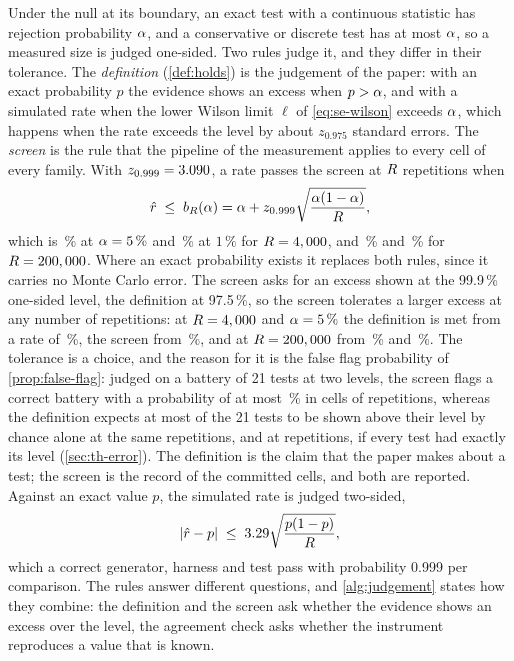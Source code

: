 Under the null at its boundary, an exact test with a continuous statistic has rejection probability $\alpha$, and a conservative or discrete test has at most $\alpha$, so a measured size is judged one-sided.
Two rules judge it, and they differ in their tolerance.
The \emph{definition} (\cref{def:holds}) is the judgement of the paper: with an exact probability $p$ the evidence shows an excess when $p>\alpha$, and with a simulated rate when the lower Wilson limit $\ell$ of \eqref{eq:se-wilson} exceeds $\alpha$, which happens when the rate exceeds the level by about $z_{0.975}$ standard errors.
The \emph{screen} is the rule that the pipeline of the measurement applies to every cell of every family.
With $z_{0.999}=3.090$, a rate passes the screen at $R$ repetitions when
\begin{equation}
\hat{r}\;\le\; b_R(\alpha)=\alpha+z_{0.999}\sqrt{\frac{\alpha(1-\alpha)}{R}},
\label{eq:bound}
\end{equation}
which is \boundFive\,\% at $\alpha=5\,\%$ and \boundOne\,\% at $1\,\%$ for $R=4,000{}$, and \boundFivePool\,\% and \boundOnePool\,\% for $R=200,000{}$.
Where an exact probability exists it replaces both rules, since it carries no Monte Carlo error.
The screen asks for an excess shown at the 99.9\,\% one-sided level, the definition at 97.5\,\%, so the screen tolerates a larger excess at any number of repetitions: at $R=4,000{}$ and $\alpha=5\,\%$ the definition is met from a rate of \intRateFiveFour\,\%, the screen from \boundFive\,\%, and at $R=200,000{}$ from \intRateFiveTwoHundredK\,\% and \boundFivePool\,\%.
The tolerance is a choice, and the reason for it is the false flag probability of \cref{prop:false-flag}: judged on a battery of 21 tests at two levels, the screen flags a correct battery with a probability of at most \flagUnion\,\% in cells of \nNullReps{} repetitions, whereas the definition expects at most \expFalseAboveFour{} of the 21 tests to be shown above their level by chance alone at the same \nNullReps{} repetitions, and \expFalseAbove{} at \nRepsPooled{} repetitions, if every test had exactly its level (\cref{sec:th-error}).
The definition is the claim that the paper makes about a test; the screen is the record of the committed cells, and both are reported.
Against an exact value $p$, the simulated rate is judged two-sided,
\begin{equation}
|\hat{r}-p|\;\le\;3.29\sqrt{\frac{p(1-p)}{R}},
\label{eq:agree}
\end{equation}
which a correct generator, harness and test pass with probability 0.999 per comparison.
The rules answer different questions, and \cref{alg:judgement} states how they combine: the definition and the screen ask whether the evidence shows an excess over the level, the agreement check asks whether the instrument reproduces a value that is known.

